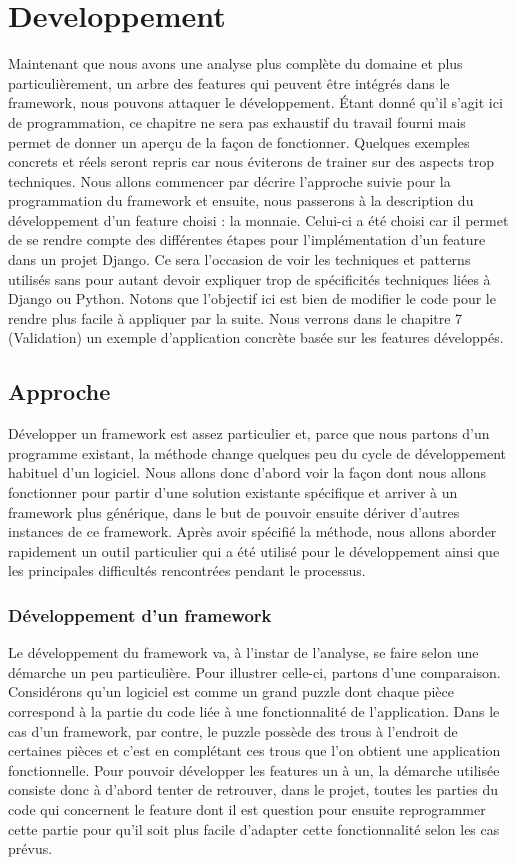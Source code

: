 \section{Developpement}

Maintenant que nous avons une analyse plus complète du domaine et plus particulièrement,  un arbre des features qui peuvent être intégrés dans le framework,  nous pouvons attaquer le développement.  Étant donné qu'il s'agit ici de programmation,  ce chapitre ne sera pas exhaustif du travail fourni mais permet de donner un aperçu de la façon de fonctionner.  Quelques exemples concrets et réels seront repris car nous éviterons de trainer sur des aspects trop techniques.  Nous allons commencer par décrire l'approche suivie pour la programmation du framework et ensuite,   nous passerons à la description du développement d'un feature choisi : la monnaie.  Celui-ci a été choisi car il permet de se rendre compte des différentes étapes pour l'implémentation d'un feature dans un projet Django.  Ce sera l'occasion de voir les techniques et patterns utilisés sans pour autant devoir expliquer trop de spécificités techniques liées à Django ou Python.  Notons que l'objectif ici est bien de modifier le code pour le rendre plus facile à appliquer par la suite.  Nous verrons dans le chapitre 7 (Validation) un exemple d'application concrète basée sur les features développés.   

\subsection{Approche}
Développer un framework est assez particulier et,  parce que nous partons d'un programme existant,  la méthode change quelques peu du cycle de développement habituel d'un logiciel.  Nous allons donc d'abord voir la façon dont nous allons fonctionner pour partir d'une solution existante spécifique et arriver à un framework plus générique,  dans le but de pouvoir ensuite dériver d'autres instances de ce framework.  Après avoir spécifié la méthode,  nous allons aborder rapidement un outil particulier qui a été utilisé pour le développement ainsi que les principales difficultés rencontrées pendant le processus.

\subsubsection{Développement d'un framework}

Le développement du framework va,  à l'instar de l'analyse,  se faire selon une démarche un peu particulière.  Pour illustrer celle-ci,  partons d'une comparaison.  Considérons qu'un logiciel est  comme un grand puzzle dont chaque pièce correspond à la partie du code liée à une fonctionnalité de l'application.  Dans le cas d'un framework,  par contre,  le puzzle possède des trous à l'endroit de certaines pièces et c'est en complétant ces trous que l'on obtient une application fonctionnelle.  Pour pouvoir développer les features un à un,  la démarche utilisée consiste donc à d'abord tenter de retrouver,  dans le projet,  toutes les parties du code qui concernent le feature dont il est question pour ensuite reprogrammer cette partie pour qu'il soit plus facile d'adapter cette fonctionnalité selon les cas prévus.

